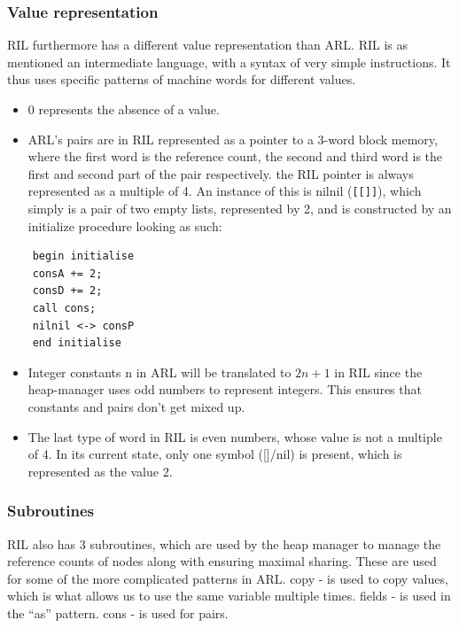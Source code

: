 \documentclass[a4paper]{article}
\begin{document}
\subsubsection{Value representation}
\label{sec:org3cd3e66}
RIL furthermore has a different value representation than ARL. RIL is as mentioned an intermediate language, with a syntax of very simple instructions. It thus uses specific patterns of machine words for different values.
\begin{itemize}
\item 0 represents the absence of a value.
\item ARL's pairs are in RIL represented as a pointer to a 3-word block memory, where the first word is the reference count, the second and third word is the first and second part of the pair respectively. the RIL pointer is always represented as a multiple of 4. An instance of this is nilnil (\texttt{[[]]}), which simply is a pair of two empty lists, represented by 2, and is constructed by an initialize procedure looking as such:
\end{itemize}

\begin{verbatim}
    begin initialise
    consA += 2;
    consD += 2;
    call cons;
    nilnil <-> consP
    end initialise
\end{verbatim}
\begin{itemize}
\item Integer constants n in ARL will be translated to \(2n+1\) in RIL since the heap-manager uses odd numbers to represent integers. This ensures that constants and pairs don't get mixed up.
\item The last type of word in RIL is even numbers, whose value is not a multiple of 4.  In its current state, only one symbol ([]/nil) is present, which is represented as the value 2.
\end{itemize}
\subsubsection{Subroutines}
\label{sec:orgee28d1e}
RIL also has 3 subroutines, which are used by the heap manager to manage the reference counts of nodes along with ensuring maximal sharing. These are used for some of the more complicated patterns in ARL.
copy - is used to copy values, which is what allows us to use the same variable multiple times.
fields - is used in the ``as'' pattern.
cons - is used for pairs.
\end{document}

